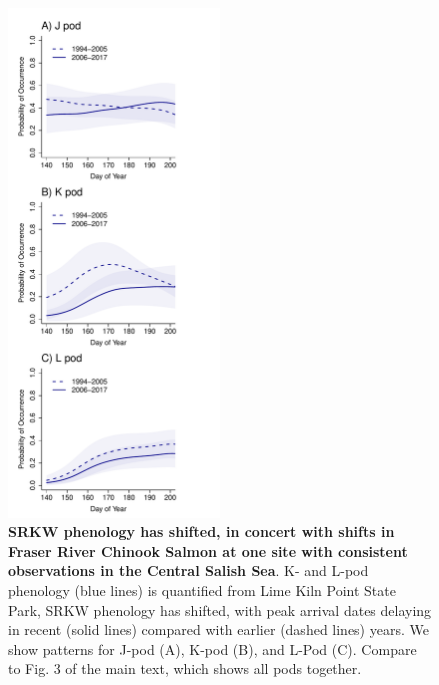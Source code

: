 \documentclass{article}
\begin{document}
\newpage
\begin{figure}[!hp]
\includegraphics[width=0.5\textwidth]{../analyses/orcaphen/figures/orcachinphenoverlap_allpods2006.pdf}
\caption{\textbf{SRKW phenology has shifted, in concert with shifts in Fraser River Chinook Salmon at one site with consistent observations in the Central Salish Sea}. K- and L-pod phenology (blue lines) is quantified from Lime Kiln Point State Park, SRKW phenology has shifted, with peak arrival dates delaying in recent (solid lines) compared with earlier (dashed lines) years. We show patterns for J-pod (A), K-pod (B), and L-Pod (C). Compare to Fig. 3 of the main text, which shows all pods together. }
\label{fig:KLchin}
\end{figure}
\end{document}
